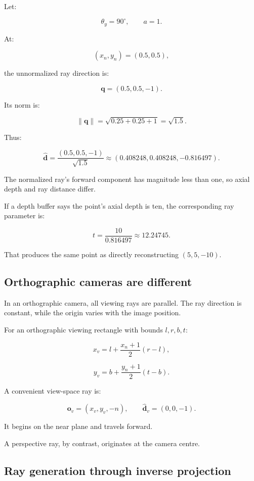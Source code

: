 Let:

\[ \theta_y=90^\circ,\qquad a=1. \]

At:

\[ (x_n,y_n)=(0.5,0.5), \]

the unnormalized ray direction is:

\[ \mathbf q=(0.5,0.5,-1). \]

Its norm is:

\[ \|\mathbf q\|= \sqrt{0.25+0.25+1} =\sqrt{1.5}. \]

Thus:

\[ \boxed{ \hat{\mathbf d} = \frac{(0.5,0.5,-1)}{\sqrt{1.5}} \approx (0.408248,0.408248,-0.816497). } \]

The normalized ray's forward component has magnitude less than one, so axial depth and ray distance differ.

If a depth buffer says the point's axial depth is ten, the corresponding ray parameter is:

\[ t=\frac{10}{0.816497}\approx12.24745. \]

That produces the same point as directly reconstructing \((5,5,-10)\).

\subsection{Orthographic cameras are different}\label{02-foundations-ii-ch035-orthographic-cameras-are-different}

In an orthographic camera, all viewing rays are parallel. The ray direction is constant, while the origin varies with the image position.

For an orthographic viewing rectangle with bounds \(l,r,b,t\):

\[ x_v=l+\frac{x_n+1}{2}(r-l), \]

\[ y_v=b+\frac{y_n+1}{2}(t-b). \]

A convenient view-space ray is:

\[ \boxed{ \mathbf o_v=(x_v,y_v,-n), \qquad \hat{\mathbf d}_v=(0,0,-1). } \]

It begins on the near plane and travels forward.

A perspective ray, by contrast, originates at the camera centre.

\subsection{Ray generation through inverse projection}\label{02-foundations-ii-ch035-ray-generation-through-inverse-projection}

